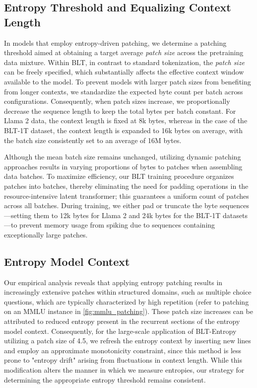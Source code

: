 \subsection{Entropy Threshold and Equalizing Context Length} In models that employ entropy-driven patching, we determine a patching threshold aimed at obtaining a target average \textit{patch size} across the pretraining data mixture. Within {\textsc BLT}, in contrast to standard tokenization, the \textit{patch size} can be freely specified, which substantially affects the effective context window available to the model. To prevent models with larger patch sizes from benefiting from longer contexts, we standardize the expected byte count per batch across configurations. Consequently, when patch sizes increase, we proportionally decrease the sequence length to keep the total bytes per batch constant. For Llama 2 data, the context length is fixed at 8k bytes, whereas in the case of the {\textsc BLT}-1T dataset, the context length is expanded to 16k bytes on average, with the batch size consistently set to an average of 16M bytes.

Although the mean batch size remains unchanged, utilizing dynamic patching approaches results in varying proportions of bytes to patches when assembling data batches. To maximize efficiency, our {\textsc BLT} training procedure organizes patches into batches, thereby eliminating the need for padding operations in the resource-intensive latent transformer; this guarantees a uniform count of patches across all batches. During training, we either pad or truncate the byte sequences—setting them to 12k bytes for Llama 2 and 24k bytes for the {\textsc BLT}-1T datasets—to prevent memory usage from spiking due to sequences containing exceptionally large patches.

\subsection{Entropy Model Context}
\label{section:entropy-context}
Our empirical analysis reveals that applying entropy patching results in increasingly extensive patches within structured domains, such as multiple choice questions, which are typically characterized by high repetition (refer to patching on an MMLU instance in \autoref{fig:mmlu_patching}). These patch size increases can be attributed to reduced entropy present in the recurrent sections of the entropy model context. Consequently, for the large-scale application of {\textsc BLT}-Entropy utilizing a patch size of 4.5, we refresh the entropy context by inserting new lines and employ an approximate monotonicity constraint, since this method is less prone to "entropy drift" arising from fluctuations in context length. While this modification alters the manner in which we measure entropies, our strategy for determining the appropriate entropy threshold remains consistent.

